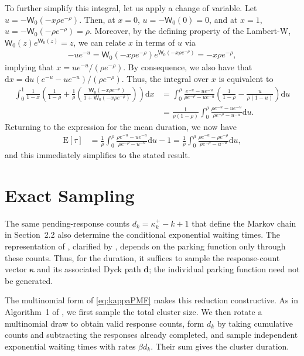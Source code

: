 \documentclass[stsy,dblanonrev]{amers/INFORMS-STSY-Template-26-02-2026/informs4}
\newcommand{\E}[1]{{\mathrm{E}\left[#1\right]}}
\begin{document}
To further simplify this integral, let us apply a change of variable. Let $u = - \mathsf{W}_0(-x\rho e^{-\rho})$. Then, at $x=0$, $u = -\mathsf{W}_0(0) = 0$, and at $x=1$, $u = -\mathsf{W}_0(-\rho e^{-\rho}) = \rho$. Moreover, by the defining property of the Lambert-W, $\mathsf{W}_0(z) e^{\mathsf{W}_0(z)} = z$, we can relate $x$ in terms of $u$ via
\begin{align}
-u e^{-u} = \mathsf{W}_0(-x\rho e^{-\rho}) e^{\mathsf{W}_0(-x\rho e^{-\rho})} = - x \rho e^{-\rho}
,
\end{align}
implying that $x = u e^{-u} / (\rho e^{-\rho})$. By consequence, we also have that $\mathrm{d}x = \mathrm{d}u (e^{-u} - u e^{-u})/(\rho e^{-\rho})$. Thus, the integral over $x$ is equivalent to
\begin{align}
\int_0^1\frac{1}{1-x}\left(\frac{1}{1-\rho} +  \frac{1}{\rho}
\left(
\frac{\mathsf{W}_0\left(-x \rho e^{-\rho}\right)}
{1 + \mathsf{W}_0\left(-x \rho e^{-\rho}\right)}
\right)\right)\mathrm{d}x
&=
\int_0^\rho
\frac{e^{-u} - u e^{-u}}{\rho e^{-\rho} - u e^{-u}}
\left(
\frac{1}{1-\rho}
-
\frac{u}{\rho(1-u)}
\right)
\mathrm{d}u
\\
&=
\frac{1}{\rho(1-\rho)}
\int_0^\rho
\frac{\rho e^{-u} - u e^{-u}}{\rho e^{-\rho} - u^{-u}} \mathrm{d}u
.
\end{align}
Returning to the expression for the mean duration, we now have
\begin{align}
\E{\tau}
&=
\frac{1}{\rho}
\int_0^\rho
\frac{\rho e^{-u} - u e^{-u}}{\rho e^{-\rho} - u^{-u}} 
\mathrm{d}u
-
1
=
\frac{1}{\rho}
\int_0^\rho
\frac{\rho e^{-u} - \rho e^{-\rho}}{\rho e^{-\rho} - u^{-u}} 
\mathrm{d}u
,
\end{align}
and this immediately simplifies to the stated result.
\hfill\Halmos\endproof


\section{Exact Sampling}\label{sec:sampling}
The same pending-response counts $d_k=\kappa_k^+-k+1$ that define the Markov chain in Section~2.2 also determine the conditional exponential waiting times. The representation of \citet{daw2023conditional}, clarified by \citet{daw2024asymmetries}, depends on the parking function only through these counts. Thus, for the duration, it suffices to sample the response-count vector $\boldsymbol\kappa$ and its associated Dyck path $\mathbf d$; the individual parking function need not be generated.

The multinomial form of \eqref{eq:kappaPMF} makes this reduction constructive. As in Algorithm~1 of \citet{daw2023conditional}, we first sample the total cluster size. We then rotate a multinomial draw to obtain valid response counts, form $d_k$ by taking cumulative counts and subtracting the responses already completed, and sample independent exponential waiting times with rates $\beta d_k$. Their sum gives the cluster duration.
\end{document}
